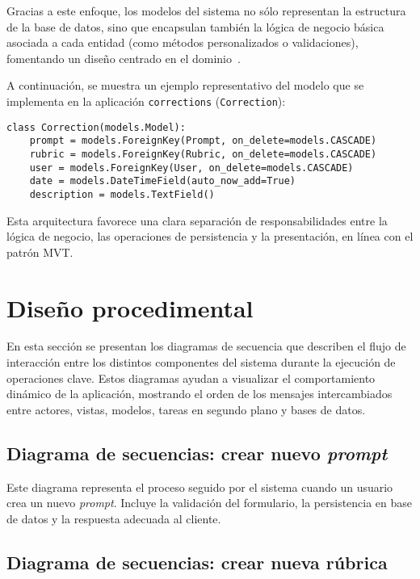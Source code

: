 Gracias a este enfoque, los modelos del sistema no sólo representan la estructura de la base de datos, sino que encapsulan también la lógica de negocio básica asociada a cada entidad (como métodos personalizados o validaciones), fomentando un diseño centrado en el dominio~\cite{web:django_queries}.

A continuación, se muestra un ejemplo representativo del modelo que se implementa en la aplicación \texttt{corrections} (\texttt{Correction}):

\begin{verbatim}
class Correction(models.Model):
    prompt = models.ForeignKey(Prompt, on_delete=models.CASCADE)
    rubric = models.ForeignKey(Rubric, on_delete=models.CASCADE)
    user = models.ForeignKey(User, on_delete=models.CASCADE)
    date = models.DateTimeField(auto_now_add=True)
    description = models.TextField()
\end{verbatim}

Esta arquitectura favorece una clara separación de responsabilidades entre la lógica de negocio, las operaciones de persistencia y la presentación, en línea con el patrón MVT.

\section{Diseño procedimental}

En esta sección se presentan los diagramas de secuencia que describen el flujo de interacción entre los distintos componentes del sistema durante la ejecución de operaciones clave. Estos diagramas ayudan a visualizar el comportamiento dinámico de la aplicación, mostrando el orden de los mensajes intercambiados entre actores, vistas, modelos, tareas en segundo plano y bases de datos.

\subsection{Diagrama de secuencias: crear nuevo \textit{prompt}}

Este diagrama representa el proceso seguido por el sistema cuando un usuario crea un nuevo \textit{prompt}. Incluye la validación del formulario, la persistencia en base de datos y la respuesta adecuada al cliente.


\subsection{Diagrama de secuencias: crear nueva rúbrica}

